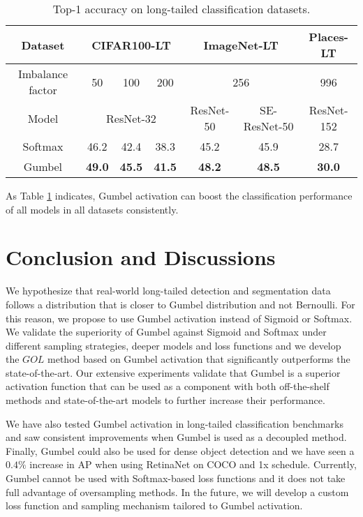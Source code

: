 \documentclass[runningheads]{llncs}
\begin{document}
\begin{table}
    \centering
    \caption{Top-1 accuracy on long-tailed classification datasets.}
    \begin{tabular}{c|ccc|cc|c}
         Dataset&\multicolumn{3}{c|}{CIFAR100-LT}&\multicolumn{2}{c|}{ImageNet-LT}&Places-LT\\
         \hline
         Imbalance factor&50&100&200&\multicolumn{2}{c|}{256}&996\\
         Model&\multicolumn{3}{c|}{ResNet-32}&ResNet-50&SE-ResNet-50&ResNet-152\\
         
         \hline
         Softmax &46.2&42.4&38.3&45.2&45.9&28.7\\
         Gumbel &\textbf{49.0}&\textbf{45.5}&\textbf{41.5}&\textbf{48.2}&\textbf{48.5}&\textbf{30.0}\\
    \end{tabular}
    \label{tab:classif_res}
    \vspace{-4mm}
\end{table}

As Table \ref{tab:classif_res} indicates, Gumbel activation can boost the classification performance of all models in all datasets consistently.








\section{Conclusion and Discussions}
\label{conclusion}
 We hypothesize that real-world long-tailed detection and segmentation data follows a distribution that is closer to Gumbel distribution and not Bernoulli. For this reason, we propose to use Gumbel activation instead of Sigmoid or Softmax. We validate the superiority of Gumbel against Sigmoid and Softmax under different sampling strategies, deeper models and loss functions and we develop the $GOL$ method based on Gumbel activation that significantly outperforms the state-of-the-art. Our extensive experiments validate that Gumbel is a superior activation function that can be used as a component with both off-the-shelf methods and state-of-the-art models to further increase their performance.
 
 We have also tested Gumbel activation in long-tailed classification benchmarks and saw consistent improvements when Gumbel is used as a decoupled method. Finally, Gumbel could also be used for dense object detection and we have seen a $0.4\%$ increase in AP when using RetinaNet on COCO and 1x schedule.
 Currently, Gumbel cannot be used with Softmax-based loss functions and it does not take full advantage of oversampling methods. In the future, we will develop a custom loss function and sampling mechanism tailored to Gumbel activation. 
 
\end{document}
